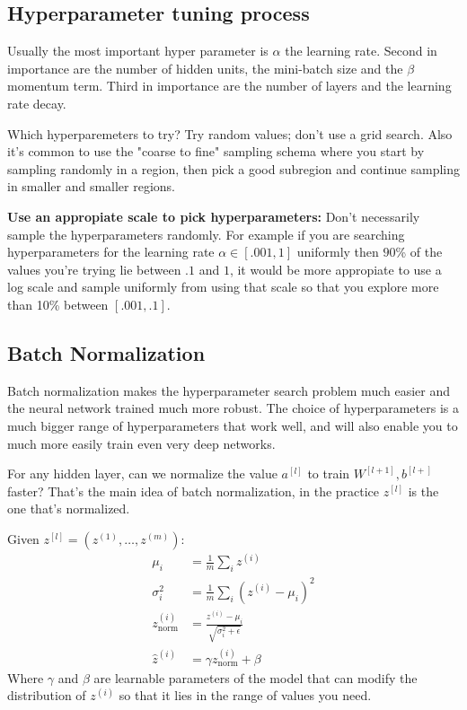 




\subsection*{Hyperparameter tuning process}

Usually the most important hyper parameter is $\alpha$ the learning rate. Second in 
importance are the number of hidden units, the mini-batch size and the $\beta$ momentum
term. Third in importance are the number of layers and the learning rate decay.

Which hyperparemeters to try? Try random values; don't use a grid search. Also it's 
common to use the "coarse to fine" sampling schema where you start by sampling randomly
in a region, then pick a good subregion and continue sampling in smaller and smaller regions.

\textbf{Use an appropiate scale to pick hyperparameters:} Don't necessarily sample 
the hyperparameters randomly. For example if you are searching hyperparameters for the
learning rate $\alpha \in [.001, 1]$ uniformly then $90$\% of the values you're 
trying lie between $.1$ and $1$, it would be more appropiate to use a log scale and sample
uniformly from using that scale so that you explore more than 10\% between $[.001,.1]$.

\subsection*{Batch Normalization}

Batch normalization makes the hyperparameter search problem much easier and the 
neural network trained much more robust. The choice of hyperparameters is a much bigger 
range  of hyperparameters that work well, and will also enable you to much more easily train 
even very deep networks.

For any hidden layer, can we normalize the value $a^{[l]}$ to train $W^{[l+1]}, b^{[l+]}$ 
faster? That's the main idea of batch normalization, in the practice $z^{[l]}$ is 
the one that's normalized. 

Given $z^{[l]} = (z^{(1)}, \dots, z^{(m)})$:
\begin{align*}
    \mu_i &= \frac{1}{m} \sum_{i} z^{(i)} \\
    \sigma_i^2 &= \frac{1}{m} \sum_{i} (z^{(i)} - \mu_i)^2 \\
    z^{(i)}_{\text{norm}} &= \frac{z^{(i)} - \mu_i}{\sqrt{\sigma_i^2 + \epsilon}} \\
    \hat{z}^{(i)} &= \gamma z^{(i)}_{\text{norm}} + \beta
\end{align*}
Where $\gamma$ and $\beta$ are learnable parameters of the model that can modify the 
distribution of $z^{(i)}$ so that it lies in the range of values you need.

